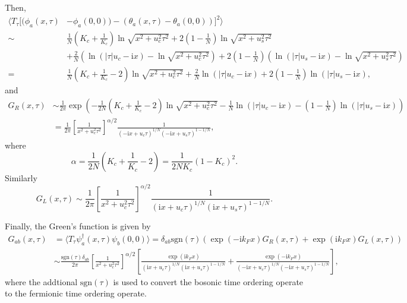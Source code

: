 \documentclass[10pt]{extarticle}
\newcommand{\ii}{\mathrm{i}}
\begin{document}
Then, 
\[
\begin{aligned}
\biggl\langle T_\tau \bigl[(\phi_a(x,\tau)&-\phi_a(0,0))-(\theta_a(x,\tau)-\theta_a(0,0))\bigr]^2\biggr\rangle\\
\sim &\frac{1}{N}\left(K_c+\frac{1}{K_c}\right) \ln \sqrt{x^2+u_c^2\tau^2}+2\left(1-\frac{1}{N}\right) \ln \sqrt{x^2+u_s^2\tau^2}\\
&+\frac{2}{N}\left(\ln (|\tau|u_c-\ii x)-\ln \sqrt{x^2+u_c^2\tau^2}\right)+2\left(1-\frac{1}{N}\right)\left(\ln (|\tau|u_s-\ii x)-\ln \sqrt{x^2+u_s^2\tau^2}\right)\\
=&\frac{1}{N}\left(K_c+\frac{1}{K_c}-2\right) \ln \sqrt{x^2+u_c^2\tau^2}+\frac{2}{N}\ln (|\tau|u_c-\ii x)+2\left(1-\frac{1}{N}\right)\ln (|\tau|u_s-\ii x),
\end{aligned}
\]
and
\[
\begin{aligned}
	G_R(x,\tau)&\sim\frac{1}{2\pi}\exp\left(-\frac{1}{2N}\left(K_c+\frac{1}{K_c}-2\right) \ln \sqrt{x^2+u_c^2\tau^2}-\frac{1}{N}\ln (|\tau|u_c-\ii x)-\left(1-\frac{1}{N}\right)\ln (|\tau|u_s-\ii x)\right)\\
	&=\frac{1}{2\pi}\left[\frac{1}{x^2+u_c^2\tau^2}\right]^{\alpha/2}\frac{1}{(-\ii x+u_c\tau)^{1/N}(-\ii x+u_s\tau)^{1-1/N}},
\end{aligned}
\]
where
\[
	\alpha=\frac{1}{2N}\left(K_c+\frac{1}{K_c}-2\right)=\frac{1}{2NK_c}(1-K_c)^2.
\]
Similarly
\[
	G_L(x,\tau)\sim \frac{1}{2\pi}\left[\frac{1}{x^2+u_c^2\tau^2}\right]^{\alpha/2}\frac{1}{(\ii x+u_c\tau)^{1/N}(\ii x+u_s\tau)^{1-1/N}}.
\]

Finally, the Green's function is given by
\[
\begin{aligned}
	G_{ab}(x,\tau)&=\langle T_\tau \psi_a^\dag(x,\tau)\psi_b(0,0)\rangle=\delta_{ab}\mathrm{sgn}(\tau)\left(\exp(-\ii k_Fx)G_R(x,\tau)+\exp(\ii k_Fx)G_L(x,\tau)\right)\\
	&\sim \frac{\mathrm{sgn}(\tau)\delta_{ab}}{2\pi}\left[\frac{1}{x^2+u_c^2\tau^2}\right]^{\alpha/2}\left[\frac{\exp(\ii k_F x)}{(\ii x+u_c\tau)^{1/N}(\ii x+u_s\tau)^{1-1/N}}+\frac{\exp(-\ii k_F x)}{(-\ii x+u_c\tau)^{1/N}(-\ii x+u_s\tau)^{1-1/N}}\right],
\end{aligned}
\]
where the addtional $\mathrm{sgn}(\tau)$ is used to convert the bosonic time ordering operate to the fermionic time ordering operate.
\end{document}
